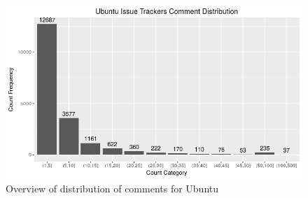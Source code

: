 \documentclass[a4paper,12pt,twoside]{report}
\begin{document}
\begin{figure}[h] %
    \centering
    \includegraphics[width=14cm]{ubuntu-comment-distribution-raw}
    \caption{Overview of distribution of comments for Ubuntu}
    \label{fig:ubuntuRawDistro}
\end{figure}



\end{document}
